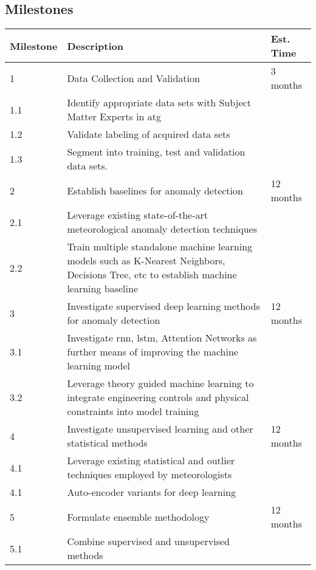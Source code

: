 \subsection{Milestones}

\begin{center}
    \begin{tabular}{|l|p{12cm}|l|}
        \hline
        Milestone & Description & Est. Time \\
        \hline
        \rowcolor{gray!50}
        1 & Data Collection and Validation & 3 months \\
        \hline
        1.1 & Identify appropriate data sets with Subject Matter Experts in \gls{atg}  & \\
        \hline
        1.2 & Validate labeling of acquired data sets  & \\
        \hline
        1.3 & Segment into training, test and validation data sets. & \\
        \hline
        \rowcolor{gray!50}
        2 & Establish baselines for anomaly detection& 12 months \\
        \hline
        2.1 &  Leverage existing state-of-the-art meteorological anomaly detection techniques  & \\
        \hline
        2.2 &  Train multiple standalone machine learning models such as K-Nearest Neighbors, Decisions Tree, etc to establish machine learning baseline & \\
        \hline
        \rowcolor{gray!50}

        3 &  Investigate supervised deep learning methods for anomaly detection & 12 months\\
        \hline
        3.1 &  Investigate \gls{rnn}, \gls{lstm}, Attention Networks as further means of improving the machine learning model & \\
        \hline
        3.2 &  Leverage theory guided machine learning to integrate engineering controls and physical constraints into model training & \\
        \hline

        \rowcolor{gray!50}
        4 & Investigate unsupervised learning and other statistical methods & 12 months\\
        \hline
        4.1 &  Leverage existing statistical and outlier techniques employed by meteorologists & \\
        \hline
        4.1 &  Auto-encoder variants for deep learning & \\
        \hline

        \rowcolor{gray!50}
        5 & Formulate ensemble methodology & 12 months \\
        \hline
        5.1 &  Combine supervised and unsupervised methods  & \\

        \hline
    \end{tabular}
\end{center}

